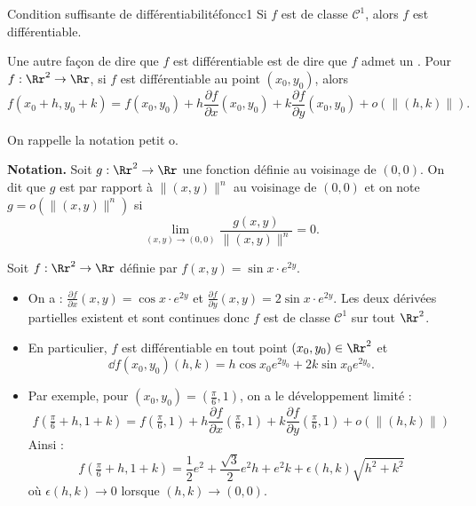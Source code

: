 \begin{theoreme}{Condition suffisante de différentiabilité}{foncc1}
	Si $f$ est de classe $\mathcal{C}^1$, alors $f$ est différentiable.
\end{theoreme}

Une autre façon de dire que $f$ est différentiable est de dire que $f$ admet un . Pour $f : \Rr^2 \to \Rr$, si $f$ est différentiable au point $(x_0,y_0)$, alors
$$f(x_0+h,y_0+k)=f(x_0,y_0)+h\frac{\partial f}{\partial x}(x_0,y_0)+k\frac{\partial f}{\partial y}(x_0,y_0)+o\left(\|(h,k)\|\right).$$

\bigskip

On rappelle la notation \og{}petit o\fg{}.

\textbf{Notation.} Soit $g :\Rr^2\to \Rr$ une fonction définie au voisinage de $(0,0)$. On dit que $g$ est  par rapport à $\|(x,y)\|^n$ au voisinage de $(0,0)$ et on note $g=o\left(\|(x,y)\|^n\right)$ si 
$$\lim_{(x,y)\to(0,0)}\frac{g(x,y)}{\|(x,y)\|^n}=0.$$

\begin{exemple}{}{}
	Soit $f : \Rr^2 \to \Rr$ définie par $f(x,y)=\sin x \cdot e ^{2y}$.
	
	\begin{itemize}
		\item On a : $\frac{\partial f}{\partial x}(x,y)=\cos x \cdot e ^{2y}$ et $\frac{\partial f}{\partial y}(x,y)=2\sin x \cdot e ^{2y}$. Les deux dérivées partielles existent et sont continues donc $f$ est de classe $\mathcal{C}^1$ sur tout $\Rr^2$. 
		
		\item En particulier, $f$ est différentiable en tout point $(x_0,y_0) \in \Rr^2$ et 
		$$\dd f (x_0,y_0)(h,k) = h\cos x_0 e ^{2y_0}+2k\sin x_0 e ^{2y_0}.$$
		
		\item Par exemple, pour $(x_0,y_0) = (\frac\pi6,1)$, on a le développement limité :
		$$f(\tfrac\pi6+h,1+k) = f(\tfrac\pi6,1) + 
		h\frac{\partial f}{\partial x}(\tfrac\pi6,1)+
		k \frac{\partial f}{\partial y}(\tfrac\pi6,1) + o\left(\|(h,k)\|\right)$$
		Ainsi :
		$$f(\tfrac\pi6+h,1+k) = \frac{1}{2}e^2 + \frac{\sqrt3}{2}e^2h + 
		e^2k + \epsilon(h,k)\sqrt{h^2+k^2}$$
		où $\epsilon(h,k) \to 0$ lorsque $(h,k) \to (0,0)$. 
	\end{itemize}
	
\end{exemple}



